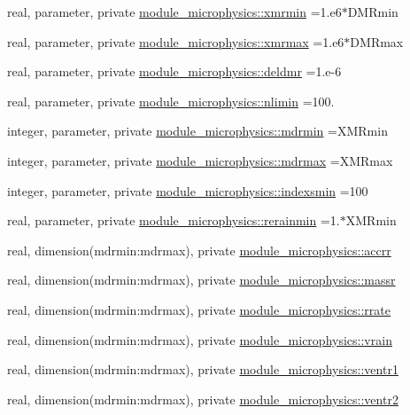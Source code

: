 \begin{DoxyCompactItemize}
real, parameter, private \hyperlink{namespacemodule__microphysics_a77fb6cadd143fc66a45cfdae1569cd81}{module\+\_\+microphysics\+::xmrmin} =1.e6$\ast$D\+M\+Rmin
\item 
real, parameter, private \hyperlink{namespacemodule__microphysics_ad2c7abf18a4c75103e965cb9c856e6f7}{module\+\_\+microphysics\+::xmrmax} =1.e6$\ast$D\+M\+Rmax
\item 
real, parameter, private \hyperlink{namespacemodule__microphysics_a8196aeaa83acb0941194563281aa721b}{module\+\_\+microphysics\+::deldmr} =1.e-\/6
\item 
real, parameter, private \hyperlink{namespacemodule__microphysics_a9a5f8e03c03725a03b9fc923d095e31a}{module\+\_\+microphysics\+::nlimin} =100.
\item 
integer, parameter, private \hyperlink{namespacemodule__microphysics_aa9201f3dba87b517d0fe88af177c4281}{module\+\_\+microphysics\+::mdrmin} =X\+M\+Rmin
\item 
integer, parameter, private \hyperlink{namespacemodule__microphysics_aa21f2a4aa4dc086cbe80493ae7da6b8b}{module\+\_\+microphysics\+::mdrmax} =X\+M\+Rmax
\item 
integer, parameter, private \hyperlink{namespacemodule__microphysics_a48966fa99ac5a7268ef5f473a675eeb2}{module\+\_\+microphysics\+::indexsmin} =100
\item 
real, parameter, private \hyperlink{namespacemodule__microphysics_a86f747f0e2a77aee3a2c8270a0f2fc6d}{module\+\_\+microphysics\+::rerainmin} =1.$\ast$X\+M\+Rmin
\item 
real, dimension(mdrmin\+:mdrmax), private \hyperlink{namespacemodule__microphysics_ac58ee32a06efc573a2c380d77cd4e5c5}{module\+\_\+microphysics\+::accrr}
\item 
real, dimension(mdrmin\+:mdrmax), private \hyperlink{namespacemodule__microphysics_a3b33f42c343ef0fbfe6585bbeccc99c7}{module\+\_\+microphysics\+::massr}
\item 
real, dimension(mdrmin\+:mdrmax), private \hyperlink{namespacemodule__microphysics_a481bd873812c291fe7ddce951cf6440d}{module\+\_\+microphysics\+::rrate}
\item 
real, dimension(mdrmin\+:mdrmax), private \hyperlink{namespacemodule__microphysics_aa57b0e61801d417b3866f69269e886b2}{module\+\_\+microphysics\+::vrain}
\item 
real, dimension(mdrmin\+:mdrmax), private \hyperlink{namespacemodule__microphysics_a17a8a4c24d0e7bd36c202103141dc1f8}{module\+\_\+microphysics\+::ventr1}
\item 
real, dimension(mdrmin\+:mdrmax), private \hyperlink{namespacemodule__microphysics_a95936805512ce6f13a072461b3694020}{module\+\_\+microphysics\+::ventr2}

\end{DoxyCompactItemize}
